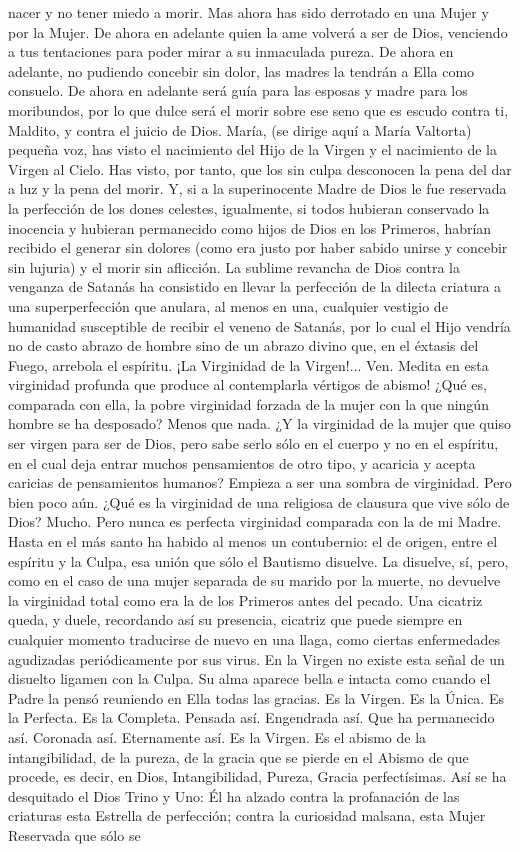 \documentclass[12pt]{book} %
\begin{document}
nacer y no tener miedo a morir. Mas ahora has sido derrotado en una Mujer y por la Mujer. De ahora en adelante quien la ame volverá a ser de Dios, venciendo a tus tentaciones para poder mirar a su inmaculada pureza. De ahora en adelante, no pudiendo concebir sin dolor, las madres la tendrán a Ella como consuelo. De ahora en adelante será guía para las esposas y madre para los moribundos, por lo que dulce será el morir sobre ese seno que es escudo contra ti, Maldito, y contra el juicio de Dios. María, (se dirige aquí a María Valtorta) pequeña voz, has visto el nacimiento del Hijo de la Virgen y el nacimiento de la Virgen al Cielo. Has visto, por tanto, que los sin culpa desconocen la pena del dar a luz y la pena del morir. Y, si a la superinocente Madre de Dios le fue reservada la perfección de los dones celestes, igualmente, si todos hubieran conservado la inocencia y hubieran permanecido como hijos de Dios en los Primeros, habrían recibido el generar sin dolores (como era justo por haber sabido unirse y concebir sin lujuria) y el morir sin aflicción. La sublime revancha de Dios contra la venganza de Satanás ha consistido en llevar la perfección de la dilecta criatura a una superperfección que anulara, al menos en una, cualquier vestigio de humanidad susceptible de recibir el veneno de Satanás, por lo cual el Hijo vendría no de casto abrazo de hombre sino de un abrazo divino que, en el éxtasis del Fuego, arrebola el espíritu. ¡La Virginidad de la Virgen!... Ven. Medita en esta virginidad profunda que produce al contemplarla vértigos de abismo! ¿Qué es, comparada con ella, la pobre virginidad forzada de la mujer con la que ningún hombre se ha desposado? Menos que nada. ¿Y la virginidad de la mujer que quiso ser virgen para ser de Dios, pero sabe serlo sólo en el cuerpo y no en el espíritu, en el cual deja entrar muchos pensamientos de otro tipo, y acaricia y acepta caricias de pensamientos humanos? Empieza a ser una sombra de virginidad. Pero bien poco aún. ¿Qué es la virginidad de una religiosa de clausura que vive sólo de Dios? Mucho. Pero nunca es perfecta virginidad comparada con la de mi Madre. Hasta en el más santo ha habido al menos un contubernio: el de origen, entre el espíritu y la Culpa, esa unión que sólo el Bautismo disuelve. La disuelve, sí, pero, como en el caso de una mujer separada de su marido por la muerte, no devuelve la virginidad total como era la de los Primeros antes del pecado. Una cicatriz queda, y duele, recordando así su presencia, cicatriz que puede siempre en cualquier momento traducirse de nuevo en una llaga, como ciertas enfermedades agudizadas periódicamente por sus virus. En la Virgen no existe esta señal de un disuelto ligamen con la Culpa. Su alma aparece bella e intacta como cuando el Padre la pensó reuniendo en Ella todas las gracias. Es la Virgen. Es la Única. Es la Perfecta. Es la Completa. Pensada así. Engendrada así. Que ha permanecido así. Coronada así. Eternamente así. Es la Virgen. Es el abismo de la intangibilidad, de la pureza, de la gracia que se pierde en el Abismo de que procede, es decir, en Dios, Intangibilidad, Pureza, Gracia perfectísimas. Así se ha desquitado el Dios Trino y Uno: Él ha alzado contra la profanación de las criaturas esta Estrella de perfección; contra la curiosidad malsana, esta Mujer Reservada que sólo se 
\end{document}
